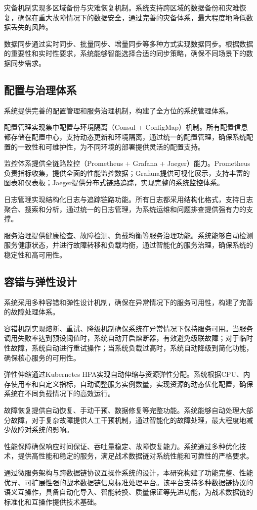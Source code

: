 灾备机制实现多区域备份与灾难恢复机制。系统支持跨区域的数据备份和灾难恢复，确保在重大故障情况下的数据安全，通过完善的灾备体系，最大程度地降低数据丢失的风险。

数据同步通过实时同步、批量同步、增量同步等多种方式实现数据同步。根据数据的重要性和实时性要求，系统能够智能选择合适的同步策略，确保不同场景下的数据同步需求。

\subsection{配置与治理体系}

系统提供完善的配置管理和服务治理机制，构建了全方位的系统管理体系。

配置管理实现集中配置与环境隔离（Consul + ConfigMap）机制。所有配置信息都存储在配置中心，支持动态更新和环境隔离，通过统一的配置管理，确保系统配置的一致性和可维护性，为不同环境的部署提供灵活的配置支持。

监控体系提供全链路监控（Prometheus + Grafana + Jaeger）能力。Prometheus负责指标收集，提供全面的性能监控数据；Grafana提供可视化展示，支持丰富的图表和仪表板；Jaeger提供分布式链路追踪，实现完整的系统监控体系。

日志管理实现结构化日志与追踪链路功能。所有日志都采用结构化格式，支持日志聚合、搜索和分析，通过统一的日志管理，为系统运维和问题排查提供强有力的支撑。

服务治理提供健康检查、故障检测、负载均衡等服务治理功能。系统能够自动检测服务健康状态，并进行故障转移和负载均衡，通过智能化的服务治理，确保系统的稳定性和高可用性。

\subsection{容错与弹性设计}

系统采用多种容错和弹性设计机制，确保在异常情况下的服务可用性，构建了完善的故障处理体系。

容错机制实现熔断、重试、降级机制确保系统在异常情况下保持服务可用。当服务调用失败率达到预设阈值时，系统自动开启熔断器，有效避免级联故障；对于临时性故障，系统自动进行重试操作；当系统负载过高时，系统自动降级到简化功能，确保核心服务的可用性。

弹性伸缩通过Kubernetes HPA实现自动伸缩与资源弹性分配。系统根据CPU、内存使用率和自定义指标，自动调整服务实例数量，实现资源的动态优化配置，确保系统在不同负载情况下的高效运行。

故障恢复提供自动恢复、手动干预、数据修复等完整功能。系统能够自动处理大部分故障，对于复杂故障提供人工干预机制，通过智能化的故障处理，最大程度地减少故障对系统的影响。

性能保障确保响应时间保证、吞吐量稳定、故障恢复能力。系统通过多种优化技术，提供高性能和稳定的服务，满足战术数据链对系统性能和可靠性的严格要求。

通过微服务架构与跨数据链协议互操作系统的设计，本研究构建了功能完整、性能优异、可扩展性强的战术数据链信息标准处理平台。该平台支持多种数据链协议的语义互操作，具备自动化导入、智能转换、质量保证等先进功能，为战术数据链的标准化和互操作提供技术基础。
